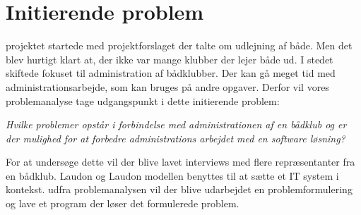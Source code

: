 

\section{Initierende problem}
\label{initierende}
projektet startede med projektforslaget der talte om udlejning af både. Men det blev hurtigt klart at, der ikke var mange klubber der lejer både ud. I stedet skiftede fokuset til administration af bådklubber. Der kan gå meget tid med administrationsarbejde, som kan bruges på andre opgaver. Derfor vil vores problemanalyse tage udgangspunkt i dette initierende problem:

\textit{Hvilke problemer opstår i forbindelse med administrationen af en bådklub og er der mulighed for at forbedre administrations arbejdet med en software løsning?}

For at undersøge dette vil der blive lavet interviews med flere repræsentanter fra en bådklub. Laudon og Laudon modellen benyttes til at sætte et IT system i kontekst. udfra problemanalysen vil der blive udarbejdet en problemformulering og lave et program der løser det formulerede problem.
